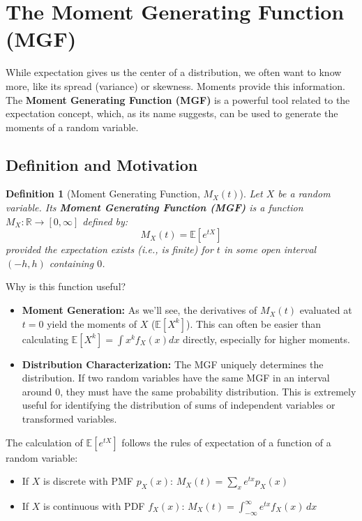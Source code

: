 \documentclass[11pt]{article}
\newtheorem{definition}[theorem]{Definition}
\theoremstyle{definition}
\theoremstyle{remark}
\newcommand{\E}{\mathbb{E}}
\begin{document}
\section{The Moment Generating Function (MGF)}

While expectation gives us the center of a distribution, we often want to know more, like its spread (variance) or skewness. Moments provide this information. The \textbf{Moment Generating Function (MGF)} is a powerful tool related to the expectation concept, which, as its name suggests, can be used to generate the moments of a random variable.

\subsection{Definition and Motivation}

\begin{definition}[Moment Generating Function, $M_X(t)$]
Let $X$ be a random variable. Its \textbf{Moment Generating Function (MGF)} is a function $M_X: \mathbb{R} \to [0, \infty]$ defined by:
\[ M_X(t) = \E[e^{tX}] \]
provided the expectation exists (i.e., is finite) for $t$ in some open interval $(-h, h)$ containing $0$.
\end{definition}

Why is this function useful?
\begin{itemize}
    \item \textbf{Moment Generation:} As we'll see, the derivatives of $M_X(t)$ evaluated at $t=0$ yield the moments of $X$ ($\E[X^k]$). This can often be easier than calculating $\E[X^k] = \int x^k f_X(x) dx$ directly, especially for higher moments.
    \item \textbf{Distribution Characterization:} The MGF uniquely determines the distribution. If two random variables have the same MGF in an interval around 0, they must have the same probability distribution. This is extremely useful for identifying the distribution of sums of independent variables or transformed variables.
\end{itemize}

The calculation of $\E[e^{tX}]$ follows the rules of expectation of a function of a random variable:
\begin{itemize}
    \item If $X$ is discrete with PMF $p_X(x)$: $M_X(t) = \sum_x e^{tx} p_X(x)$
    \item If $X$ is continuous with PDF $f_X(x)$: $M_X(t) = \int_{-\infty}^{\infty} e^{tx} f_X(x) \, dx$
\end{itemize}
\end{document}
